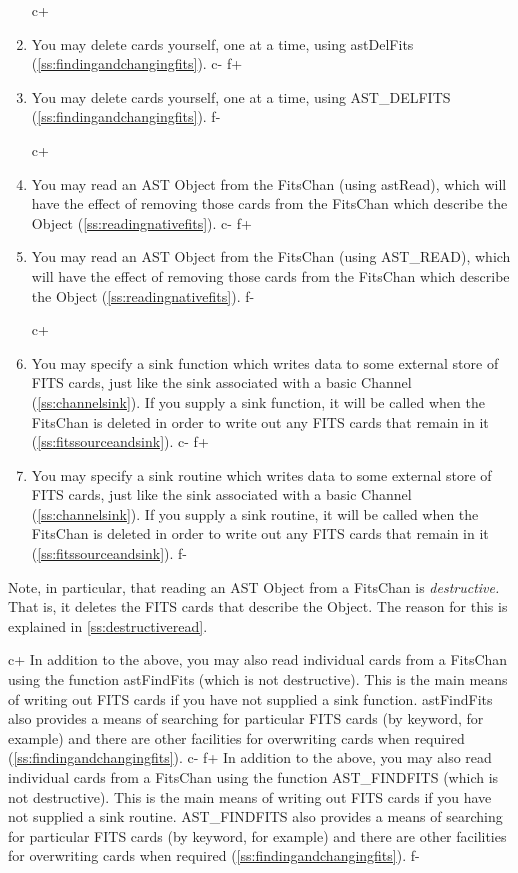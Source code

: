 \documentclass[twoside,11pt]{article}
\newcommand{\secref}[1]{\S\ref{#1}}
\renewcommand{\secref}[1]{\ref{#1}}
\begin{document}
\begin{enumerate}
c+
\item You may delete cards yourself, one at a time, using astDelFits
(\secref{ss:findingandchangingfits}).
c-
f+
\item You may delete cards yourself, one at a time, using AST\_DELFITS
(\secref{ss:findingandchangingfits}).
f-

c+
\item You may read an AST Object from the FitsChan (using astRead),
which will have the effect of removing those cards from the FitsChan
which describe the Object (\secref{ss:readingnativefits}).
c-
f+
\item You may read an AST Object from the FitsChan (using AST\_READ),
which will have the effect of removing those cards from the FitsChan
which describe the Object (\secref{ss:readingnativefits}).
f-

c+
\item You may specify a sink function which writes data to some
external store of FITS cards, just like the sink associated with a
basic Channel (\secref{ss:channelsink}). If you supply a sink function,
it will be called when the FitsChan is deleted in order to write out
any FITS cards that remain in it (\secref{ss:fitssourceandsink}).
c-
f+
\item You may specify a sink routine which writes data to some
external store of FITS cards, just like the sink associated with a
basic Channel (\secref{ss:channelsink}). If you supply a sink routine,
it will be called when the FitsChan is deleted in order to write out
any FITS cards that remain in it (\secref{ss:fitssourceandsink}).
f-
\end{enumerate}
 
Note, in particular, that reading an AST Object from a FitsChan is
{\em{destructive.}} That is, it deletes the FITS cards that describe the
Object. The reason for this is explained in
\secref{ss:destructiveread}.

c+
In addition to the above, you may also read individual cards from a
FitsChan using the function astFindFits (which is not
destructive). This is the main means of writing out FITS cards if you
have not supplied a sink function.  astFindFits also provides a means
of searching for particular FITS cards (by keyword, for example) and
there are other facilities for overwriting cards when required
(\secref{ss:findingandchangingfits}).
c-
f+
In addition to the above, you may also read individual cards from a
FitsChan using the function AST\_FINDFITS (which is not
destructive). This is the main means of writing out FITS cards if you
have not supplied a sink routine.  AST\_FINDFITS also provides a means
of searching for particular FITS cards (by keyword, for example) and
there are other facilities for overwriting cards when required
(\secref{ss:findingandchangingfits}).
f-
\end{document}
